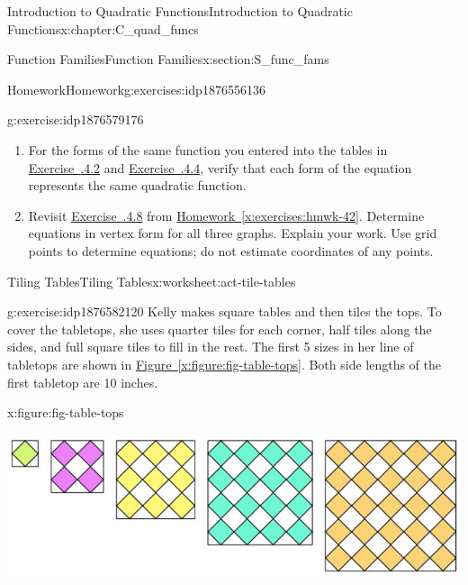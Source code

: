 \documentclass[oneside,10pt,]{book}
\newcommand{\xreffont}{\relax}
\numberwithin{equation}{chapter}
\begin{document}
\begin{chapterptx}{Introduction to Quadratic Functions}{}{Introduction to Quadratic Functions}{}{}{x:chapter:C_quad_funcs}
\begin{sectionptx}{Function Families}{}{Function Families}{}{}{x:section:S_func_fams}
\begin{exercises-subsection}{Homework}{}{Homework}{}{}{g:exercises:idp1876556136}
\begin{divisionexercise}{5}{}{}{g:exercise:idp1876579176}
\begin{enumerate}[font=\bfseries,label=(\alph*),ref=\alph*]
\item{}For the forms of the same function you entered into the tables in \hyperlink{x:exercise:exer-factored-eqs}{Exercise~{\xreffont 4.2.4.2}} and \hyperlink{x:exercise:exer-quad-funcs-stnd}{Exercise~{\xreffont 4.2.4.4}}, verify that each form of the equation represents the same quadratic function.%
\item{}Revisit \hyperlink{x:exercise:exer-3parabs}{Exercise~{\xreffont 4.2.4.8}} from \hyperref[x:exercises:hmwk-42]{Homework~{\xreffont\ref{x:exercises:hmwk-42}}}. Determine equations in vertex form for all three graphs. Explain your work. Use grid points to determine equations; do not estimate coordinates of any points.%
\end{enumerate}
\end{divisionexercise}%
\end{exercises-subsection}
%
%
\typeout{************************************************}
\typeout{************************************************}
%
\begin{worksheet-subsection}{Tiling Tables}{}{Tiling Tables}{}{}{x:worksheet:act-tile-tables}
\begin{divisionexercise}{1}{}{}{g:exercise:idp1876582120}%
Kelly makes square tables and then tiles the tops. To cover the tabletops, she uses quarter tiles for each corner, half tiles along the sides, and full square tiles to fill in the rest. The first 5 sizes in her line of tabletops are shown in \hyperref[x:figure:fig-table-tops]{Figure~{\xreffont\ref{x:figure:fig-table-tops}}}. Both side lengths of the first tabletop are 10 inches.%
\begin{figureptx}{}{x:figure:fig-table-tops}{}%
\begin{image}{0.1}{0.8}{0.1}%
\includegraphics[width=\linewidth]{external/table-tops.pdf}
\end{image}%
\tcblower
\end{figureptx}%
\begin{enumerate}[font=\bfseries,label=(\alph*),ref=\alph*]

\end{enumerate}
\end{divisionexercise}
\end{worksheet-subsection}
\end{sectionptx}
\end{chapterptx}
\end{document}
